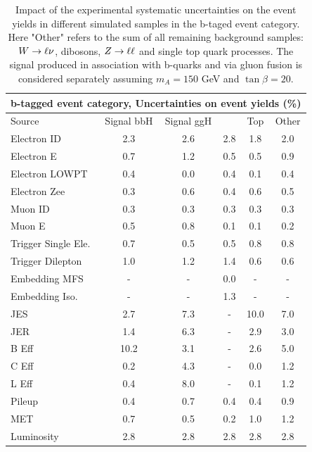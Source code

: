 	
\begin{table}[tp]
  \centering
  \begin{tabular}{lccccc}
    \hline\hline
      	      		   \multicolumn{6}{c}{ b-tagged event  category, Uncertainties on event yields (\%)}  \\
     \hline
      Source             & Signal bbH 	   & Signal ggH      & \Ztautau      &  Top 	& Other	 \\
    \hline
Electron ID  		 &2.3		   &2.6		     &	2.8          &1.8	&2.0	 \\
Electron E	  	 &0.7		   &1.2		     &0.5	     &0.5	&0.9	 \\
Electron LOWPT	  	 &0.4		   &0.0		     &0.4	     &0.1	&0.4	 \\ 
Electron Zee	  	 &0.3		   &0.6		     &0.4	     &0.6	&0.5	 \\
Muon ID 		 &0.3		   &0.3	   	     &0.3	     &0.3	&0.3	 \\
Muon E		  	 &0.5		   &0.8		     &0.1	     &0.1	&0.2	 \\
Trigger Single	Ele.  	 &0.7		   &0.5		     &0.5	     &0.8	&0.8	 \\
Trigger Dilepton  	 &1.0		   &1.2		     &1.4	     &0.6	&0.6	 \\
Embedding MFS	  	 &-		   &-		     &0.0	     &-		&-	 \\
Embedding Iso.	  	 &-		   &-		     &1.3	     &-		&-	 \\
JES		  	 &2.7		   &7.3		     &-		     &10.0	&7.0	 \\
JER		  	 &1.4		   &6.3		     &-		     &2.9	&3.0	 \\
B Eff		  	 &10.2		   &3.1		     &-		     &2.6	&5.0	 \\
C Eff		  	 &0.2		   &4.3		     &-		     &0.0	&1.2	 \\
L Eff		  	 &0.4		   &8.0		     &-		     &0.1	&1.2	 \\
Pileup			 &0.4		   &0.7		     &0.4	     &0.4	&0.9	 \\
MET 		  	 &0.7		   &0.5 	     &0.2	     &1.0	&1.2	 \\
Luminosity	  	 &2.8 		   &2.8	 	     &2.8 	     &2.8 	&2.8 	 \\

    \hline
    \hline
  \end{tabular}
  \caption{Impact of the experimental systematic uncertainties on the event yields in different
	simulated samples in the b-taged event category. Here "Other" refers to the sum of all remaining background 
	samples: $W\rightarrow \ell \nu$, 
	dibosons, $Z\rightarrow \ell \ell$ and single top quark processes. The signal produced in association with b-quarks  and via 
	gluon fusion is considered separately assuming $m_{A}=150$ GeV and $\tan\beta=20$.} 

  \label{tab:ExpSys:btag}
\end{table}




